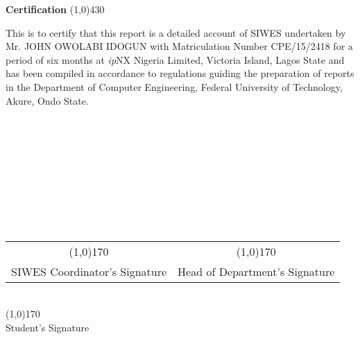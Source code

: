 \begin{center}
{\huge \bf Certification}
\line(1,0){430}
\end{center}



This is to certify that this report is a detailed account of \ac{SIWES} undertaken by Mr. JOHN OWOLABI IDOGUN with Matriculation Number CPE/15/2418 for a period of six months at \textit{ip}NX Nigeria Limited, Victoria Island, Lagos State and has been compiled in accordance to regulations guiding the preparation of reports in the Department of Computer Engineering, Federal University of Technology, Akure, Ondo State.\\\\\\\\\\\\\\\\\\\

\begin{center}
	\begin{tabular}{c c}
		\line(1,0){170} & \hspace{2.5cm} \line(1,0){170}\\
		SIWES Coordinator's Signature  & \hspace{2.5cm} Head of Department's Signature\\
	\end{tabular}\\
	\vspace{1.0in}
	\line(1,0){170}\\Student's Signature
\end{center}